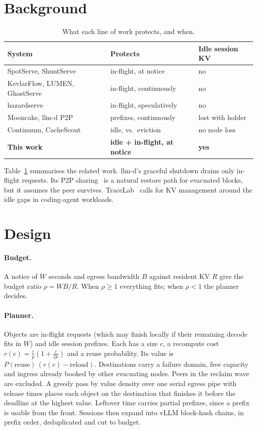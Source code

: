 \documentclass[10pt,twocolumn]{article}
\begin{document}
\section{Background}
\begin{table}[t]
\centering\footnotesize\setlength{\tabcolsep}{3.5pt}
\begin{tabular}{@{}lll@{}}
\toprule
System & Protects & Idle session KV \\
\midrule
SpotServe, ShuntServe & in-flight, at notice & no \\
KevlarFlow, LUMEN, GhostServe & in-flight, continuously & no \\
hazardserve & in-flight, speculatively & no \\
Mooncake, llm-d P2P & prefixes, continuously & lost with holder \\
Continuum, CacheScout & idle, vs.\ eviction & no node loss \\
\textbf{This work} & \textbf{idle + in-flight, at notice} & \textbf{yes} \\
\bottomrule
\end{tabular}
\caption{What each line of work protects, and when.}
\label{tab:related}
\end{table}
Table~\ref{tab:related} summarises the related work. llm-d's graceful shutdown drains
only in-flight requests. Its P2P sharing~\cite{llmdp2p} is a natural restore path for
evacuated blocks, but it assumes the peer survives. TraceLab~\cite{tracelab} calls for
KV management around the idle gaps in coding-agent workloads.

\section{Design}\label{sec:design}
\paragraph{Budget.} A notice of $W$ seconds and egress bandwidth $B$ against resident
KV $R$ give the budget ratio $\rho = WB/R$. When $\rho \ge 1$ everything fits; when
$\rho < 1$ the planner decides.

\paragraph{Planner.} Objects are in-flight requests (which may finish locally if their
remaining decode fits in $W$) and idle session prefixes. Each has a size $c$, a
recompute cost $r(c) = \frac{c}{p}\left(1 + \frac{c}{2k}\right)$ and a reuse
probability. Its value is $P(\text{reuse})\,(r(c) - \text{reload})$. Destinations
carry a failure domain, free capacity and ingress already booked by other evacuating
nodes. Peers in the reclaim wave are excluded. A greedy pass by value density over one
serial egress pipe with release times places each object on the destination that
finishes it before the deadline at the highest value. Leftover time carries partial
prefixes, since a prefix is usable from the front. Sessions then expand into vLLM
block-hash chains, in prefix order, deduplicated and cut to budget.
\end{document}

